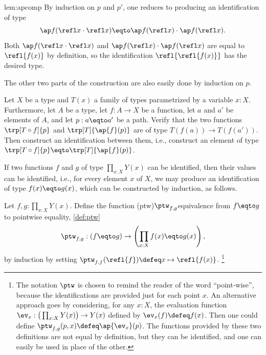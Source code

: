 \begin{implementation}{lem:apcomp}
  By induction on $p$ and $p'$, one reduces to producing an identification of type
  \[
    \ap f (\refl x \cdot \refl x) \eqto  \ap f ( \refl x ) \cdot  \ap f ( \refl x ).
  \]
  Both $\ap f (\refl x \cdot \refl x)$ and
  $\ap f ( \refl x ) \cdot  \ap f ( \refl x )$
  are equal to $\refl { f(x) }$ by definition,
  so the identification $\refl {\refl { f(x) }}$ has the desired type.

  The other two parts of the construction are also easily done by induction on $p$.
\end{implementation}

\begin{xca}\label{xca:trp-ap}
  Let $X$ be a type and $T(x)$ a family of types parametrized by a variable $x:X$. Furthermore, let $A$ be a type, let $f:A\to X$ be a
  function, let $a$ and $a'$ be elements of $A$, and let $p: a \eqto a'$ be a path.
  Verify that the two functions $\trp[T \circ f]{p}$ and $\trp[T]{\ap{f}(p)}$ are of type $T(f(a)) \to T(f(a'))$.
  Then construct an identification between them, i.e., construct an element of type $\trp[T \circ f]{p} \eqto \trp[T]{\ap{f}(p)}$.
\end{xca}

If two functions $f$ and $g$ of type $\prod_{x:X} Y(x)$ can be identified, then their values can be identified, i.e., for every element $x$ of
$X$, we may produce an identification of type $f(x) \eqto g(x)$, which can be constructed by induction, as follows.

\begin{definition}\label{def:ptw}
  Let $f,g:\prod_{x:X} Y(x)$. Define the function
\glossary(ptw){$\protect\ptw_{f,g}$}{equivalence from $f\protect\eqto g$ to pointwise equality, \cref{def:ptw}}
  \[
    {\ptw}_{f,g}: ( f \eqto g ) \to \left( \prod_{x:X} f(x) \eqto g(x) \right),
  \]
  by induction by setting ${\ptw}_{f,f}(\refl{f}) \defeq x \mapsto \refl{f(x)}$.
  \footnote{The notation $\ptw$ is chosen to remind the reader of the word ``point-wise'', 
  because the identifications are provided just for each point $x$. An alternative approach goes by considering, for any $x:X$, the evaluation function $\ev_x : \big(\prod_{x:X} Y(x)\bigr) \to Y(x)$ defined by
    $\ev_x(f) \defeq f(x)$.  Then one could define ${\ptw}_{f,g}(p,x) \defeq \ap{\ev_x}(p)$.  The functions provided by these two definitions
  are not equal by definition, but they can be identified, and one can easily be used in place of the other.}
\end{definition}

